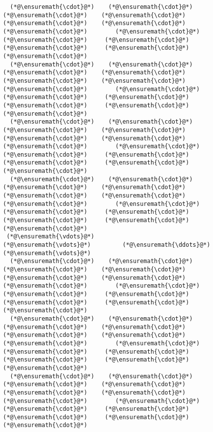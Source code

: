 \documentclass[12pt,a4paper]{article}
\begin{document}
\begin{lstlisting}
  (*@\ensuremath{\cdot}@*)    (*@\ensuremath{\cdot}@*)    (*@\ensuremath{\cdot}@*)    (*@\ensuremath{\cdot}@*)    (*@\ensuremath{\cdot}@*)    (*@\ensuremath{\cdot}@*)    (*@\ensuremath{\cdot}@*)        (*@\ensuremath{\cdot}@*)     (*@\ensuremath{\cdot}@*)     (*@\ensuremath{\cdot}@*)     (*@\ensuremath{\cdot}@*)     (*@\ensuremath{\cdot}@*)     (*@\ensuremath{\cdot}@*) 
  (*@\ensuremath{\cdot}@*)    (*@\ensuremath{\cdot}@*)    (*@\ensuremath{\cdot}@*)    (*@\ensuremath{\cdot}@*)    (*@\ensuremath{\cdot}@*)    (*@\ensuremath{\cdot}@*)    (*@\ensuremath{\cdot}@*)        (*@\ensuremath{\cdot}@*)     (*@\ensuremath{\cdot}@*)     (*@\ensuremath{\cdot}@*)     (*@\ensuremath{\cdot}@*)     (*@\ensuremath{\cdot}@*)     (*@\ensuremath{\cdot}@*) 
  (*@\ensuremath{\cdot}@*)    (*@\ensuremath{\cdot}@*)    (*@\ensuremath{\cdot}@*)    (*@\ensuremath{\cdot}@*)    (*@\ensuremath{\cdot}@*)    (*@\ensuremath{\cdot}@*)    (*@\ensuremath{\cdot}@*)        (*@\ensuremath{\cdot}@*)     (*@\ensuremath{\cdot}@*)     (*@\ensuremath{\cdot}@*)     (*@\ensuremath{\cdot}@*)     (*@\ensuremath{\cdot}@*)     (*@\ensuremath{\cdot}@*) 
  (*@\ensuremath{\cdot}@*)    (*@\ensuremath{\cdot}@*)    (*@\ensuremath{\cdot}@*)    (*@\ensuremath{\cdot}@*)    (*@\ensuremath{\cdot}@*)    (*@\ensuremath{\cdot}@*)    (*@\ensuremath{\cdot}@*)        (*@\ensuremath{\cdot}@*)     (*@\ensuremath{\cdot}@*)     (*@\ensuremath{\cdot}@*)     (*@\ensuremath{\cdot}@*)     (*@\ensuremath{\cdot}@*)     (*@\ensuremath{\cdot}@*) 
 (*@\ensuremath{\vdots}@*)                        (*@\ensuremath{\vdots}@*)         (*@\ensuremath{\ddots}@*)                           (*@\ensuremath{\vdots}@*)    
  (*@\ensuremath{\cdot}@*)    (*@\ensuremath{\cdot}@*)    (*@\ensuremath{\cdot}@*)    (*@\ensuremath{\cdot}@*)    (*@\ensuremath{\cdot}@*)    (*@\ensuremath{\cdot}@*)    (*@\ensuremath{\cdot}@*)        (*@\ensuremath{\cdot}@*)     (*@\ensuremath{\cdot}@*)     (*@\ensuremath{\cdot}@*)     (*@\ensuremath{\cdot}@*)     (*@\ensuremath{\cdot}@*)     (*@\ensuremath{\cdot}@*) 
  (*@\ensuremath{\cdot}@*)    (*@\ensuremath{\cdot}@*)    (*@\ensuremath{\cdot}@*)    (*@\ensuremath{\cdot}@*)    (*@\ensuremath{\cdot}@*)    (*@\ensuremath{\cdot}@*)    (*@\ensuremath{\cdot}@*)        (*@\ensuremath{\cdot}@*)     (*@\ensuremath{\cdot}@*)     (*@\ensuremath{\cdot}@*)     (*@\ensuremath{\cdot}@*)     (*@\ensuremath{\cdot}@*)     (*@\ensuremath{\cdot}@*) 
  (*@\ensuremath{\cdot}@*)    (*@\ensuremath{\cdot}@*)    (*@\ensuremath{\cdot}@*)    (*@\ensuremath{\cdot}@*)    (*@\ensuremath{\cdot}@*)    (*@\ensuremath{\cdot}@*)    (*@\ensuremath{\cdot}@*)        (*@\ensuremath{\cdot}@*)     (*@\ensuremath{\cdot}@*)     (*@\ensuremath{\cdot}@*)     (*@\ensuremath{\cdot}@*)     (*@\ensuremath{\cdot}@*)     (*@\ensuremath{\cdot}@*) 

\end{lstlisting}
\end{document}
